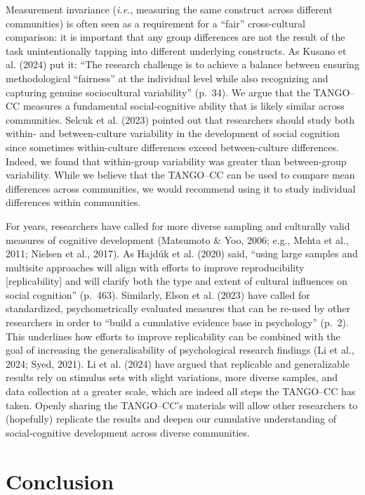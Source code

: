 \documentclass[
  man,floatsintext]{apa7}
\begin{document}
Measurement invariance (\emph{i.e.}, measuring the same construct across different communities) is often seen as a requirement for a ``fair'' cross-cultural comparison: it is important that any group differences are not the result of the task unintentionally tapping into different underlying constructs.
As Kusano et al. (2024) put it: ``The research challenge is to achieve a balance between ensuring methodological ``fairness'' at the individual level while also recognizing and capturing genuine sociocultural variability'' (p.~34).
We argue that the TANGO--CC measures a fundamental social-cognitive ability that is likely similar across communities.
Selcuk et al. (2023) pointed out that researchers should study both within- and between-culture variability in the development of social cognition since sometimes within-culture differences exceed between-culture differences.
Indeed, we found that within-group variability was greater than between-group variability.
While we believe that the TANGO--CC can be used to compare mean differences across communities, we would recommend using it to study individual differences within communities.

For years, researchers have called for more diverse sampling and culturally valid measures of cognitive development (Matsumoto \& Yoo, 2006; e.g., Mehta et al., 2011; Nielsen et al., 2017).
As Hajdúk et al. (2020) said, ``using large samples and multisite approaches will align with efforts to improve reproducibility {[}replicability{]} and will clarify both the type and extent of cultural influences on social cognition'' (p.~463).
Similarly, Elson et al. (2023) have called for standardized, psychometrically evaluated measures that can be re-used by other researchers in order to ``build a cumulative evidence base in psychology'' (p.~2).
This underlines how efforts to improve replicability can be combined with the goal of increasing the generalisability of psychological research findings (Li et al., 2024; Syed, 2021).
Li et al. (2024) have argued that replicable and generalizable results rely on stimulus sets with slight variations, more diverse samples, and data collection at a greater scale, which are indeed all steps the TANGO--CC has taken.
Openly sharing the TANGO--CC's materials will allow other researchers to (hopefully) replicate the results and deepen our cumulative understanding of social-cognitive development across diverse communities.

\section{Conclusion}\label{conclusion}
\end{document}
